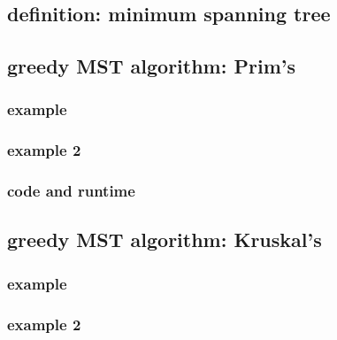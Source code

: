 



\subsection{definition: minimum spanning tree}





%



\subsection{greedy MST algorithm: Prim's}



\subsubsection{example}



\subsubsection{example 2}



\subsubsection{code and runtime}




\subsection{greedy MST algorithm: Kruskal's}



\subsubsection{example}



\subsubsection{example 2}

